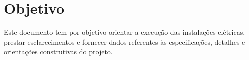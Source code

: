 \section{Objetivo}

Este documento tem por objetivo orientar a execução das instalações elétricas, prestar esclarecimentos e fornecer dados referentes às especificações, detalhes e orientações construtivas do projeto.


